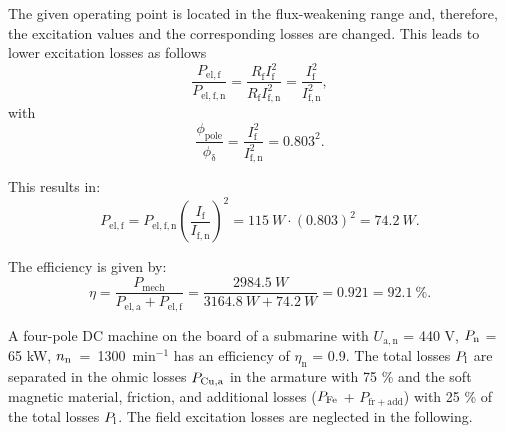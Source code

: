 \begin{solutionblock}
    The given operating point is located in the flux-weakening range and, therefore, the excitation values and the corresponding losses are changed.
    This leads to lower excitation losses as follows
    \begin{equation}
        \frac{P_{\mathrm{el,f}}}{P_{\mathrm{el,f,n}}}
        = \frac{R_{\mathrm{f}} I^2_{\mathrm{f}}}{R_{\mathrm{f}} I^2_{\mathrm{f,n}}}
        = \frac{I^2_{\mathrm{f}}}{I^2_{\mathrm{f,n}}},
    \end{equation}
    with
    \begin{equation}
        \frac{\phi_{\mathrm{pole}}}{\phi_{\updelta}}
        = \frac{I^2_{\mathrm{f}}}{I^2_{\mathrm{f,n}}}
        = 0.803^2.
    \end{equation}

    This results in:
    \begin{equation}
        P_{\mathrm{el,f}} = P_{\mathrm{el,f,n}} \left( \frac{I_{\mathrm{f}}}{I_{\mathrm{f,n}}} \right)^2
        = 115 \ \si{W} \cdot \left(0.803 \right)^2
        = 74.2 \ \si{W}.
    \end{equation}

    The efficiency is given by:
    \begin{equation}
        \eta = \frac{P_{\mathrm{mech}}}{P_{\mathrm{el,a}} + P_{\mathrm{el,f}}}
        = \frac{2984.5 \ \si{W}}{3164.8 \ \si{W} + 74.2 \ \si{W}}
        = 0.921 = 92.1 \ \%.
    \end{equation}

\end{solutionblock}





A four-pole DC machine on the board of a submarine with $U_{\mathrm{a,n}}$ = 440 V, $P_{\mathrm{n}}$ = 65 kW, $n_{\mathrm{n}}$~=~1300~$\mathrm{min^{-1}}$ has an efficiency of $\eta_{\mathrm{n}}$ = 0.9. The total losses $P_{\mathrm{l}}$ are separated in the ohmic losses $P_{\mathrm{Cu,a}}$ in the armature with 75 \% and the soft magnetic material, friction, and additional losses ($P_{\mathrm{Fe}}$ + $P_{\mathrm{fr+add}}$) with 25 \% of the total losses $P_{\mathrm{l}}$. The field excitation losses are neglected in the following.






